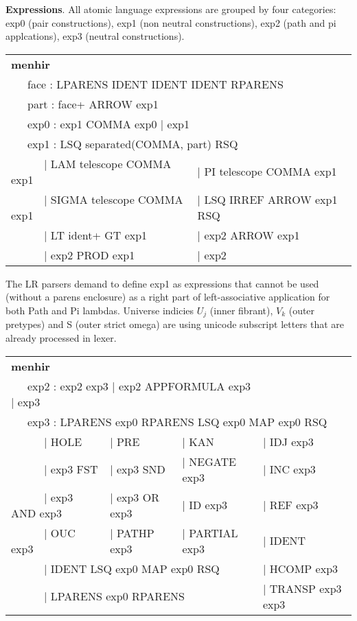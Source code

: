 \documentclass[a4paper,UKenglish,cleveref, autoref, thm-restate]{lipics-v2021}
\newcommand{\tabstyle}[0]{\scriptsize\ttfamily\fontseries{l}\selectfont}
\begin{document}
\textbf{Expressions}. All atomic language expressions are grouped by four categories:
exp0 (pair constructions), exp1 (non neutral constructions), exp2 (path and pi applcations),
exp3 (neutral constructions).

\begin{table}[ht!]
\tabstyle
\begin{tabular}{ll}
\textbf{menhir} \\
\multicolumn{2}{l}{\ \ \ face : LPARENS IDENT IDENT IDENT RPARENS } \\
\multicolumn{2}{l}{\ \ \ part : face+ ARROW exp1 } \\
\multicolumn{2}{l}{\ \ \ exp0 : exp1 COMMA exp0 | exp1 } \\
\multicolumn{2}{l}{\ \ \ exp1 : LSQ separated(COMMA, part) RSQ } \\
\ \ \ \ \ \ | LAM telescope COMMA exp1   & | PI telescope COMMA exp1 \\
\ \ \ \ \ \ | SIGMA telescope COMMA exp1 & | LSQ IRREF ARROW exp1 RSQ \\
\ \ \ \ \ \ | LT ident+ GT exp1          & | exp2 ARROW exp1 \\
\ \ \ \ \ \ | exp2 PROD exp1             & | exp2 \\
\end{tabular}
\end{table}

The LR parsers demand to define exp1 as expressions that cannot be used (without a parens enclosure)
as a right part of left-associative application for both Path and Pi lambdas.
Universe indicies $U_j$ (inner fibrant), $V_k$ (outer pretypes) and S (outer strict omega)
are using unicode subscript letters that are already processed in lexer.

\begin{table}[ht!]
\tabstyle
\begin{tabular}{llll}
\textbf{menhir} \\
\multicolumn{3}{l}{\ \ \ exp2 : exp2 exp3 | exp2 APPFORMULA exp3 | exp3 } \\
\multicolumn{4}{l}{\ \ \ exp3 : LPARENS exp0 RPARENS LSQ exp0 MAP exp0 RSQ } \\
\ \ \ \ \ \   | HOLE              & | PRE          & | KAN          & | IDJ exp3 \\
\ \ \ \ \ \   | exp3 FST          & | exp3 SND     & | NEGATE exp3  & | INC exp3 \\
\ \ \ \ \ \   | exp3 AND exp3     & | exp3 OR exp3 & | ID exp3      & | REF exp3\\
\ \ \ \ \ \   | OUC exp3          & | PATHP exp3   & | PARTIAL exp3 & | IDENT \\
\multicolumn{3}{l}{\ \ \ \ \ \    | IDENT LSQ exp0 MAP exp0 RSQ }   & | HCOMP exp3 \\
\multicolumn{3}{l}{\ \ \ \ \ \    | LPARENS exp0 RPARENS }          & | TRANSP exp3 exp3 \\
\end{tabular}
\end{table}
\end{document}
